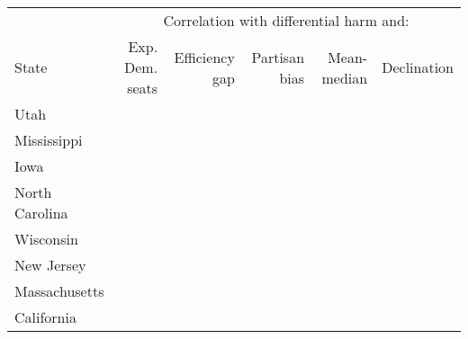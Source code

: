 
\begin{tabular}[t]{l>{}r>{}r>{}r>{}r>{}r}
\toprule
\multicolumn{1}{c}{ } & \multicolumn{5}{c}{Correlation with differential harm and:} \\
\cmidrule(l{3pt}r{3pt}){2-6}
State & Exp. Dem. seats & Efficiency gap & Partisan bias & Mean-median & Declination\\
\midrule
Utah & \cellcolor[HTML]{8A671F}{$-0.983$} & \cellcolor[HTML]{75689E}{$0.957$} & \cellcolor[HTML]{927421}{$-0.893$} & \cellcolor[HTML]{8E6C20}{$-0.945$} & \cellcolor[HTML]{947722}{$-0.876$}\\
Mississippi & \cellcolor[HTML]{9D8627}{$-0.772$} & \cellcolor[HTML]{BFD9D5}{$0.207$} & \cellcolor[HTML]{E8EEE3}{$0.031$} & \cellcolor[HTML]{E7E5C0}{$-0.096$} & \cellcolor[HTML]{A89735}{$-0.656$}\\
Iowa & \cellcolor[HTML]{AD9F3D}{$-0.597$} & \cellcolor[HTML]{A0B5C2}{$0.449$} & \cellcolor[HTML]{DED99D}{$-0.185$} & \cellcolor[HTML]{C4DCD7}{$0.184$} & \cellcolor[HTML]{A9C2C9}{$0.365$}\\
North Carolina & \cellcolor[HTML]{8E6C20}{$-0.943$} & \cellcolor[HTML]{8A88AE}{$0.740$} & \cellcolor[HTML]{9AAABC}{$0.520$} & \cellcolor[HTML]{8C8DB0}{$0.704$} & \cellcolor[HTML]{9BAABC}{$0.519$}\\
Wisconsin & \cellcolor[HTML]{998024}{$-0.816$} & \cellcolor[HTML]{929BB4}{$0.621$} & \cellcolor[HTML]{C2DBD7}{$0.191$} & \cellcolor[HTML]{9096B2}{$0.652$} & \cellcolor[HTML]{A8C1C8}{$0.374$}\\
New Jersey & \cellcolor[HTML]{9B8425}{$-0.789$} & \cellcolor[HTML]{9FB4C1}{$0.459$} & \cellcolor[HTML]{DCE8DF}{$0.082$} & \cellcolor[HTML]{EEF0E0}{$-0.014$} & \cellcolor[HTML]{A7C0C7}{$0.381$}\\
Massachusetts & \cellcolor[HTML]{987E23}{$-0.826$} & \cellcolor[HTML]{E9E9CA}{$-0.069$} & \cellcolor[HTML]{E1DDA7}{$-0.158$} & \cellcolor[HTML]{CADFD9}{$0.159$} & \cellcolor[HTML]{808080}{NA}\\
California & \cellcolor[HTML]{AEA03E}{$-0.590$} & \cellcolor[HTML]{939BB4}{$0.616$} & \cellcolor[HTML]{DCD798}{$-0.199$} & \cellcolor[HTML]{D1C97B}{$-0.302$} & \cellcolor[HTML]{AAC3C9}{$0.359$}\\
\bottomrule
\end{tabular}
